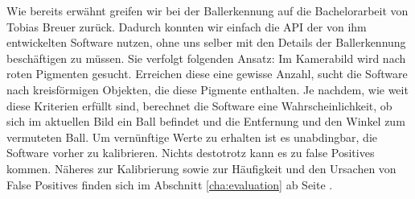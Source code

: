 Wie bereits erwähnt greifen wir bei der Ballerkennung auf die
Bachelorarbeit von Tobias Breuer zurück. Dadurch konnten wir einfach
die API der von ihm entwickelten Software nutzen, ohne uns selber mit
den Details der Ballerkennung beschäftigen zu müssen. Sie verfolgt
folgenden Ansatz: Im Kamerabild wird nach roten Pigmenten
gesucht. Erreichen diese eine gewisse Anzahl, sucht die Software nach
kreisförmigen Objekten, die diese Pigmente enthalten. Je nachdem,
wie weit diese Kriterien erfüllt sind, berechnet die Software eine
Wahrscheinlichkeit, ob sich im aktuellen Bild ein Ball befindet und
die Entfernung und den Winkel zum vermuteten Ball. Um vernünftige
Werte zu erhalten ist es unabdingbar, die Software vorher zu
kalibrieren. Nichts destotrotz kann es zu false Positives
kommen. Näheres zur Kalibrierung sowie zur Häufigkeit und den Ursachen von
False Positives finden sich im Abschnitt \ref{cha:evaluation} ab Seite \pageref{cha:evaluation}.
